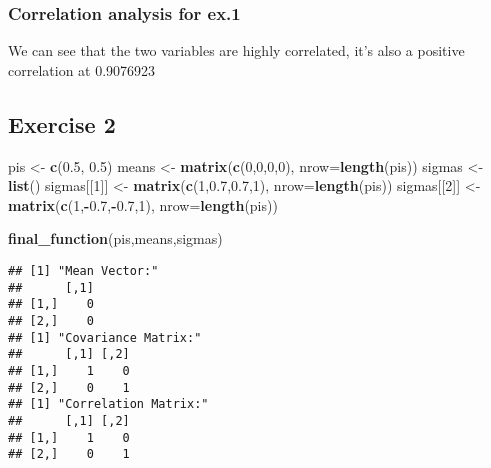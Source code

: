 \documentclass[]{article}
\newenvironment{Shaded}{\begin{snugshade}}{\end{snugshade}}
\newcommand{\DataTypeTok}[1]{\textcolor[rgb]{0.13,0.29,0.53}{#1}}
\newcommand{\DecValTok}[1]{\textcolor[rgb]{0.00,0.00,0.81}{#1}}
\newcommand{\FloatTok}[1]{\textcolor[rgb]{0.00,0.00,0.81}{#1}}
\newcommand{\KeywordTok}[1]{\textcolor[rgb]{0.13,0.29,0.53}{\textbf{#1}}}
\newcommand{\NormalTok}[1]{#1}
\newcommand{\OperatorTok}[1]{\textcolor[rgb]{0.81,0.36,0.00}{\textbf{#1}}}
\newcommand{\StringTok}[1]{\textcolor[rgb]{0.31,0.60,0.02}{#1}}
\begin{document}
\hypertarget{correlation-analysis-for-ex.1}{%
\subsubsection{Correlation analysis for
ex.1}\label{correlation-analysis-for-ex.1}}

We can see that the two variables are highly correlated, it's also a
positive correlation at 0.9076923

\newpage

\hypertarget{exercise-2}{%
\subsection{Exercise 2}\label{exercise-2}}

\begin{Shaded}
\begin{Highlighting}[]
\NormalTok{pis <-}\StringTok{ }\KeywordTok{c}\NormalTok{(}\FloatTok{0.5}\NormalTok{, }\FloatTok{0.5}\NormalTok{)}
\NormalTok{means <-}\StringTok{ }\KeywordTok{matrix}\NormalTok{(}\KeywordTok{c}\NormalTok{(}\DecValTok{0}\NormalTok{,}\DecValTok{0}\NormalTok{,}\DecValTok{0}\NormalTok{,}\DecValTok{0}\NormalTok{), }\DataTypeTok{nrow=}\KeywordTok{length}\NormalTok{(pis))}
\NormalTok{sigmas <-}\StringTok{ }\KeywordTok{list}\NormalTok{()}
\NormalTok{sigmas[[}\DecValTok{1}\NormalTok{]] <-}\StringTok{ }\KeywordTok{matrix}\NormalTok{(}\KeywordTok{c}\NormalTok{(}\DecValTok{1}\NormalTok{,}\FloatTok{0.7}\NormalTok{,}\FloatTok{0.7}\NormalTok{,}\DecValTok{1}\NormalTok{), }\DataTypeTok{nrow=}\KeywordTok{length}\NormalTok{(pis))}
\NormalTok{sigmas[[}\DecValTok{2}\NormalTok{]] <-}\StringTok{ }\KeywordTok{matrix}\NormalTok{(}\KeywordTok{c}\NormalTok{(}\DecValTok{1}\NormalTok{,}\OperatorTok{-}\FloatTok{0.7}\NormalTok{,}\OperatorTok{-}\FloatTok{0.7}\NormalTok{,}\DecValTok{1}\NormalTok{), }\DataTypeTok{nrow=}\KeywordTok{length}\NormalTok{(pis))}
\end{Highlighting}
\end{Shaded}

\begin{Shaded}
\begin{Highlighting}[]
\KeywordTok{final_function}\NormalTok{(pis,means,sigmas)}
\end{Highlighting}
\end{Shaded}

\begin{verbatim}
## [1] "Mean Vector:"
##      [,1]
## [1,]    0
## [2,]    0
## [1] "Covariance Matrix:"
##      [,1] [,2]
## [1,]    1    0
## [2,]    0    1
## [1] "Correlation Matrix:"
##      [,1] [,2]
## [1,]    1    0
## [2,]    0    1
\end{verbatim}
\end{document}

